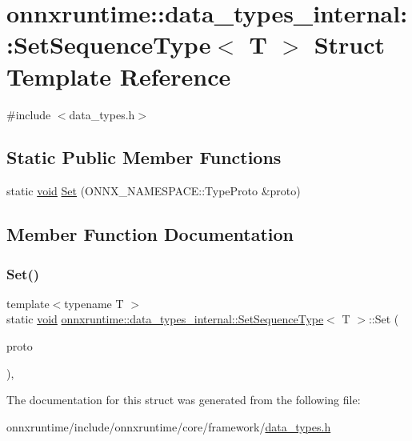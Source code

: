 \hypertarget{structonnxruntime_1_1data__types__internal_1_1SetSequenceType}{}\section{onnxruntime\+:\+:data\+\_\+types\+\_\+internal\+:\+:Set\+Sequence\+Type$<$ T $>$ Struct Template Reference}
\label{structonnxruntime_1_1data__types__internal_1_1SetSequenceType}


{\ttfamily \#include $<$data\+\_\+types.\+h$>$}

\subsection*{Static Public Member Functions}
\begin{DoxyCompactItemize}
\item 
static \mbox{\hyperlink{mlasi_8h_a88f941d423cb2a819b70a1358982b1a6}{void}} \mbox{\hyperlink{structonnxruntime_1_1data__types__internal_1_1SetSequenceType_aebb3815febb5874c24a31e75c37a379f}{Set}} (O\+N\+N\+X\+\_\+\+N\+A\+M\+E\+S\+P\+A\+C\+E\+::\+Type\+Proto \&proto)
\end{DoxyCompactItemize}


\subsection{Member Function Documentation}
\mbox{\label{structonnxruntime_1_1data__types__internal_1_1SetSequenceType_aebb3815febb5874c24a31e75c37a379f}} 
\subsubsection{\texorpdfstring{Set()}{Set()}}
{\footnotesize\ttfamily template$<$typename T $>$ \\
static \mbox{\hyperlink{mlasi_8h_a88f941d423cb2a819b70a1358982b1a6}{void}} \mbox{\hyperlink{structonnxruntime_1_1data__types__internal_1_1SetSequenceType}{onnxruntime\+::data\+\_\+types\+\_\+internal\+::\+Set\+Sequence\+Type}}$<$ T $>$\+::Set (\begin{DoxyParamCaption}\item[{O\+N\+N\+X\+\_\+\+N\+A\+M\+E\+S\+P\+A\+C\+E\+::\+Type\+Proto \&}]{proto }\end{DoxyParamCaption})\hspace{0.3cm}{\ttfamily [inline]}, {\ttfamily [static]}}



The documentation for this struct was generated from the following file\+:\begin{DoxyCompactItemize}
\item 
onnxruntime/include/onnxruntime/core/framework/\mbox{\hyperlink{data__types_8h}{data\+\_\+types.\+h}}\end{DoxyCompactItemize}
